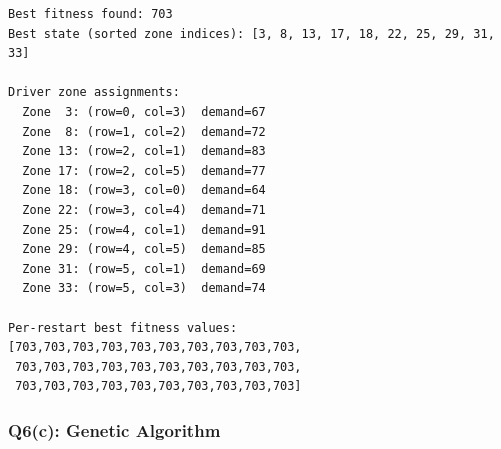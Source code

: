 \documentclass[12pt,a4paper]{article}
\begin{document}
\begin{lstlisting}[style=output]
Best fitness found: 703
Best state (sorted zone indices): [3, 8, 13, 17, 18, 22, 25, 29, 31, 33]

Driver zone assignments:
  Zone  3: (row=0, col=3)  demand=67
  Zone  8: (row=1, col=2)  demand=72
  Zone 13: (row=2, col=1)  demand=83
  Zone 17: (row=2, col=5)  demand=77
  Zone 18: (row=3, col=0)  demand=64
  Zone 22: (row=3, col=4)  demand=71
  Zone 25: (row=4, col=1)  demand=91
  Zone 29: (row=4, col=5)  demand=85
  Zone 31: (row=5, col=1)  demand=69
  Zone 33: (row=5, col=3)  demand=74

Per-restart best fitness values:
[703,703,703,703,703,703,703,703,703,703,
 703,703,703,703,703,703,703,703,703,703,
 703,703,703,703,703,703,703,703,703,703]
\end{lstlisting}

\subsubsection*{Q6(c): Genetic Algorithm}
\end{document}
